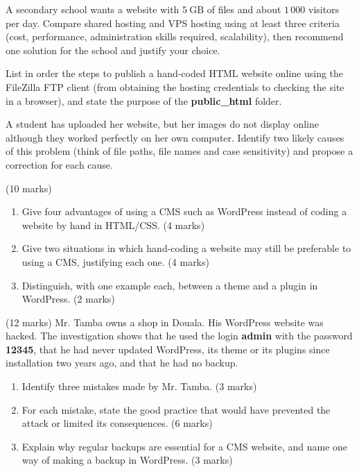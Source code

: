 \documentclass[11pt]{article}
\newcommand{\cle}[1]{{\popxbold\color{popdark}#1}}
\newcounter{popsec}
\newcounter{popsub}
\newcommand{\courssub}[1]{%
  \stepcounter{popsub}%
  \par\vspace{9pt}\noindent{\popxbold\fontsize{11.5}{13}\selectfont\color{popink}{\color{poporange}\thepopsec.\thepopsub}\hspace{6pt}#1}\par\nopagebreak\vspace{4pt}
}
\begin{document}
\begin{exercice}
A secondary school wants a website with $5\ \mathrm{GB}$ of files and about $1\,000$ visitors per day. Compare \cle{shared hosting} and \cle{VPS hosting} using at least three criteria (cost, performance, administration skills required, scalability), then recommend one solution for the school and justify your choice.
\end{exercice}

\begin{exercice}
List in order the steps to publish a hand-coded HTML website online using the FileZilla FTP client (from obtaining the hosting credentials to checking the site in a browser), and state the purpose of the \textbf{public\_html} folder.
\end{exercice}

\begin{exercice}
A student has uploaded her website, but her images do not display online although they worked perfectly on her own computer. Identify two likely causes of this problem (think of file paths, file names and case sensitivity) and propose a correction for each cause.
\end{exercice}

\courssub{I prepare for the GCE}

\begin{exercice} (10 marks)
\begin{enumerate}
\item Give four advantages of using a CMS such as WordPress instead of coding a website by hand in HTML/CSS. \hfill (4 marks)
\item Give two situations in which hand-coding a website may still be preferable to using a CMS, justifying each one. \hfill (4 marks)
\item Distinguish, with one example each, between a \cle{theme} and a \cle{plugin} in WordPress. \hfill (2 marks)
\end{enumerate}
\end{exercice}

\begin{exercice} (12 marks)
Mr. Tamba owns a shop in Douala. His WordPress website was hacked. The investigation shows that he used the login \textbf{admin} with the password \textbf{12345}, that he had never updated WordPress, its theme or its plugins since installation two years ago, and that he had no backup.
\begin{enumerate}
\item Identify three mistakes made by Mr. Tamba. \hfill (3 marks)
\item For each mistake, state the good practice that would have prevented the attack or limited its consequences. \hfill (6 marks)
\item Explain why regular backups are essential for a CMS website, and name one way of making a backup in WordPress. \hfill (3 marks)
\end{enumerate}
\end{exercice}
\end{document}
